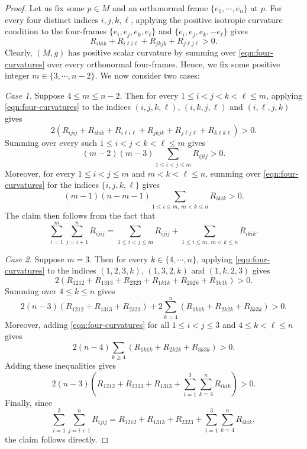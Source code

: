 \documentclass[10pt,a4paper]{amsart}
\begin{document}
\begin{proof}
    Let us fix some $p\in M$ and an orthonormal frame $\{e_1,\cdots,e_n\}$ at $p$. For every four distinct indices $i,j,k,\ell$, applying the positive isotropic curvature condition to the four-frames $\{e_i,e_j,e_k,e_{\ell}\}$ and $\{e_i,e_j,e_k,-e_{\ell}\}$ gives
    \begin{equation}\label{eqn:four-curvatures}
    R_{ikik}+R_{i\ell i\ell}+R_{jkjk}+R_{j\ell j\ell}>0.
    \end{equation}
    Clearly, $(M,g)$ has positive scalar curvature by summing over \eqref{eqn:four-curvatures} over every orthonormal four-frames. Hence, we fix some positive integer $m\in \{3,\cdots,n-2\}$. We now consider two cases:

    \textit{Case 1.} Suppose $4\leq m\leq n-2$. Then for every $1\leq i<j<k<\ell\leq m$, applying \eqref{eqn:four-curvatures} to the indices $(i,j,k,\ell)$, $(i,k,j,\ell)$ and $(i,\ell,j,k)$ gives
    \[
    2(R_{ijij}+R_{ikik}+R_{i\ell i\ell}+R_{jkjk}+R_{j\ell j\ell}+R_{k\ell k\ell})>0.
    \]
    Summing over every such $1\leq i<j<k<\ell\leq m$ gives
    \[
        (m-2)(m-3)\sum_{1\leq i<j\leq m}R_{ijij}>0.
    \]
    Moreover, for every $1\leq i<j\leq m$ and $m<k<\ell\leq n$, summing over \eqref{eqn:four-curvatures} for the indices $\{i,j,k,\ell\}$ gives
    \[
        (m-1)(n-m-1)\sum_{1\leq i\leq m,\,m<k\leq n}R_{ikik}>0.
    \]
    The claim then follows from the fact that  
    \[\sum_{i=1}^m\sum_{j=i+1}^nR_{ijij}=\sum_{1\leq i<j\leq m}R_{ijij}+\sum_{1\leq i\leq m,\,m<k\leq n}R_{ikik}.
    \]
    
    \textit{Case 2.} Suppose $m=3$. Then for every $k\in \{4,\cdots,n\}$, applying \eqref{eqn:four-curvatures} to the indices $(1,2,3,k)$, $(1,3,2,k)$ and $(1,k,2,3)$ gives
    \[
    2(R_{1212}+R_{1313}+R_{2323}+R_{1k1k}+R_{2k2k}+R_{3k3k})>0.
    \]
    Summing over $4\leq k\leq n$ gives $$2(n-3)(R_{1212}+R_{1313}+R_{2323})+2\sum_{k=4}^n(R_{1k1k}+R_{2k2k}+R_{3k3k})>0.$$ 
    Moreover, adding \eqref{eqn:four-curvatures} for all $1\leq i<j\leq 3$ and $4\leq k<\ell\leq n$ gives
    \[
    2(n-4)\sum_{k\geq 4}(R_{1k1k}+R_{2k2k}+R_{3k3k})>0.
    \]
    Adding these inequalities gives
    \[
    2(n-3)(R_{1212}+R_{2323}+R_{1313}+\sum_{i=1}^3\sum_{k=4}^nR_{ikik})>0.
    \]
    Finally, since $$\sum_{i=1}^3\sum_{j=i+1}^nR_{ijij}=R_{1212}+R_{1313}+R_{2323}+\sum_{i=1}^3\sum_{k=4}^nR_{ikik},$$ the claim follows directly.
\end{proof}
\end{document}
